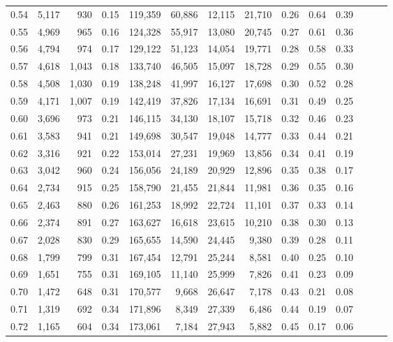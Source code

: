 \begin{tabular}{rrrrrrrrrrrrrr}
0.54 &  5,117 &    930 &  0.15 &  119,359 &   60,886 &  12,115 &  21,710 &  0.26 &  0.64 &      0.39 \\
0.55 &  4,969 &    965 &  0.16 &  124,328 &   55,917 &  13,080 &  20,745 &  0.27 &  0.61 &      0.36 \\
0.56 &  4,794 &    974 &  0.17 &  129,122 &   51,123 &  14,054 &  19,771 &  0.28 &  0.58 &      0.33 \\
0.57 &  4,618 &  1,043 &  0.18 &  133,740 &   46,505 &  15,097 &  18,728 &  0.29 &  0.55 &      0.30 \\
0.58 &  4,508 &  1,030 &  0.19 &  138,248 &   41,997 &  16,127 &  17,698 &  0.30 &  0.52 &      0.28 \\
0.59 &  4,171 &  1,007 &  0.19 &  142,419 &   37,826 &  17,134 &  16,691 &  0.31 &  0.49 &      0.25 \\
0.60 &  3,696 &    973 &  0.21 &  146,115 &   34,130 &  18,107 &  15,718 &  0.32 &  0.46 &      0.23 \\
0.61 &  3,583 &    941 &  0.21 &  149,698 &   30,547 &  19,048 &  14,777 &  0.33 &  0.44 &      0.21 \\
0.62 &  3,316 &    921 &  0.22 &  153,014 &   27,231 &  19,969 &  13,856 &  0.34 &  0.41 &      0.19 \\
0.63 &  3,042 &    960 &  0.24 &  156,056 &   24,189 &  20,929 &  12,896 &  0.35 &  0.38 &      0.17 \\
0.64 &  2,734 &    915 &  0.25 &  158,790 &   21,455 &  21,844 &  11,981 &  0.36 &  0.35 &      0.16 \\
0.65 &  2,463 &    880 &  0.26 &  161,253 &   18,992 &  22,724 &  11,101 &  0.37 &  0.33 &      0.14 \\
0.66 &  2,374 &    891 &  0.27 &  163,627 &   16,618 &  23,615 &  10,210 &  0.38 &  0.30 &      0.13 \\
0.67 &  2,028 &    830 &  0.29 &  165,655 &   14,590 &  24,445 &   9,380 &  0.39 &  0.28 &      0.11 \\
0.68 &  1,799 &    799 &  0.31 &  167,454 &   12,791 &  25,244 &   8,581 &  0.40 &  0.25 &      0.10 \\
0.69 &  1,651 &    755 &  0.31 &  169,105 &   11,140 &  25,999 &   7,826 &  0.41 &  0.23 &      0.09 \\
0.70 &  1,472 &    648 &  0.31 &  170,577 &    9,668 &  26,647 &   7,178 &  0.43 &  0.21 &      0.08 \\
0.71 &  1,319 &    692 &  0.34 &  171,896 &    8,349 &  27,339 &   6,486 &  0.44 &  0.19 &      0.07 \\
0.72 &  1,165 &    604 &  0.34 &  173,061 &    7,184 &  27,943 &   5,882 &  0.45 &  0.17 &      0.06 \\

\end{tabular}
